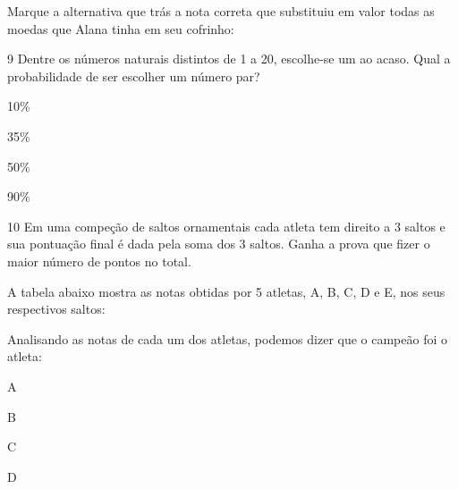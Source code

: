 {Marque a alternativa que trás a nota correta que substituiu em valor
todas as moedas que Alana tinha em seu cofrinho:



\num{9} Dentre os números naturais distintos de 1 a 20, escolhe-se um ao
acaso. Qual a probabilidade de ser escolher um número par?

\begin{escolha}
\item
  10\%
\item
  35\%
\item
  50\%
\item
  90\%
\end{escolha}


\num{10} Em uma compeção de saltos ornamentais cada atleta tem direito a 3
saltos e sua pontuação final é dada pela soma dos 3 saltos. Ganha a
prova que fizer o maior número de pontos no total.

A tabela abaixo mostra as notas obtidas por 5 atletas, A, B, C, D e E,
nos seus respectivos saltos:


Analisando as notas de cada um dos atletas, podemos dizer que o campeão
foi o atleta:

\begin{escolha}
\item
  A
\item
  B
\item
  C
\item
  D
\end{escolha}

}
